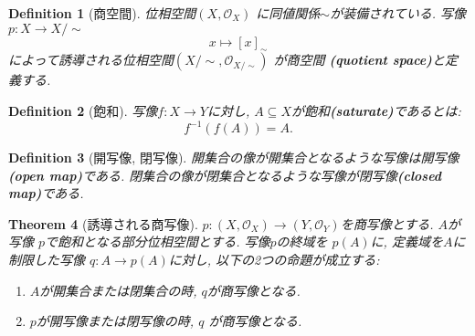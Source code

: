 \documentclass[lualatex]{ltjsbook}
\newtheorem{theorem}{Theorem}[chapter]
\newtheorem{definition}[theorem]{Definition}
\theoremstyle{remark}
\theoremstyle{plain}
\begin{document}
\begin{definition}[商空間]
	位相空間$\left( X,  \mathcal{O}_X \right) $ に同値関係$\sim$が装備されている. 
	 写像$p: X \to X / \sim $
      $$
	x \mapsto [x]_{\sim}
      $$
      によって誘導される位相空間$\left( X / \sim ,  \mathcal{O}_{X / \sim} \right) $ が商空間 \textbf{(quotient space)}と定義する.
\end{definition}

\begin{definition}[飽和]
	写像$f:X \to Y$に対し,  $A \subseteq X$が飽和\textbf{(saturate)}であるとは:
	\[
	f^{-1}\left(f( A) \right) = A
	.\] 
\end{definition}

\begin{definition}[開写像,  閉写像]
開集合の像が開集合となるような写像は開写像\textbf{(open map)}である. 閉集合の像が閉集合となるような写像が閉写像\textbf{(closed map)}である.	
\end{definition}

\begin{theorem}[誘導される商写像]
	$p: (X, \mathcal{O}_X) \to \left( Y, \mathcal{O}_Y \right) $を商写像とする. $A$が写像 $p$で飽和となる部分位相空間とする.  写像$p$の終域を $p(A)$に,  定義域を$A$に制限した写像 $q: A \to p(A)$に対し,  以下の2つの命題が成立する:
	\begin{enumerate}
		\item $A$が開集合または閉集合の時,   $q$が商写像となる.
		\item  $p$が開写像または閉写像の時,   $q$ が商写像となる.
	\end{enumerate}
\end{theorem}
\end{document}
